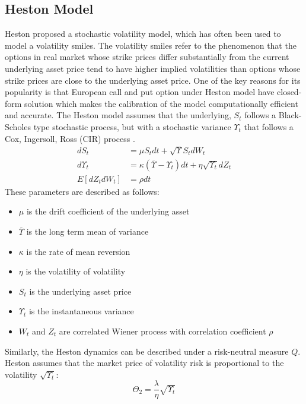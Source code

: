 \documentclass[letterpaper,12pt,titlepage,oneside,final]{book}
\numberwithin{equation}{section}
\theoremstyle{definition}
\begin{document}
\subsection{Heston Model}
\label{sec:heston}
Heston \cite{heston1993closed} proposed a stochastic volatility model, which has often been used to model a volatility smiles.  The volatility smiles refer to the phenomenon that the options in real market whose strike prices differ substantially from the current underlying asset price tend to have higher implied volatilities than options whose strike prices are close to the underlying asset price. One of the key reasons for its popularity is that European call and put option under Heston model have closed-form solution which makes the calibration of the model computationally efficient and accurate.
The Heston model assumes that the underlying, $S_t$ follows a Black-Scholes type stochastic process, but with a stochastic variance $\Upsilon_t$ that follows a Cox, Ingersoll, Ross (CIR) process \cite{cox2005theory}.
\[
\begin{split}
dS_t&=\mu S_t dt + \sqrt{\Upsilon} S_t dW_t\\
d\Upsilon_t&=\kappa(\overline{\Upsilon}-\Upsilon_t)dt+\eta \sqrt{\Upsilon_t}dZ_t\\
E[dZ_tdW_t]&=\rho dt
\end{split}
\]
These parameters are described as follows:
\begin{itemize}
  \item $\mu$ is the drift coefficient of the underlying asset
  \item $\overline{\Upsilon}$ is the long term mean of variance
  \item $\kappa$ is the rate of mean reversion
  \item $\eta$ is the volatility of volatility
  \item $S_t$ is the underlying asset price
  \item $\Upsilon_t$ is the  instantaneous variance
  \item $W_t$ and $Z_t$ are correlated Wiener process with correlation coefficient $\rho$
\end{itemize}
Similarly, the Heston dynamics can be described  under a risk-neutral measure $Q$.
Heston \cite{heston1993closed} assumes that the market price of volatility risk is  proportional to the volatility $\sqrt{\Upsilon_t}$:
\begin{equation}
\Theta_{2}=\frac{\lambda}{\eta} \sqrt{\Upsilon_t}
\label{eq:price-vol-risk}
\end{equation}
\end{document}

